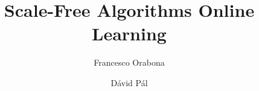 \documentclass{elsarticle}
\begin{document}
\begin{frontmatter}

\title{Scale-Free Algorithms Online Learning}


\author{Francesco Orabona}

\author{D\'avid P\'al}

\address{Yahoo Labs, 11th Floor, 229 West 43rd Street, New York, NY 10036, USA}

\begin{abstract}

\end{abstract}

\end{frontmatter}










\clearpage

{\small


}

\appendix






\end{document}
